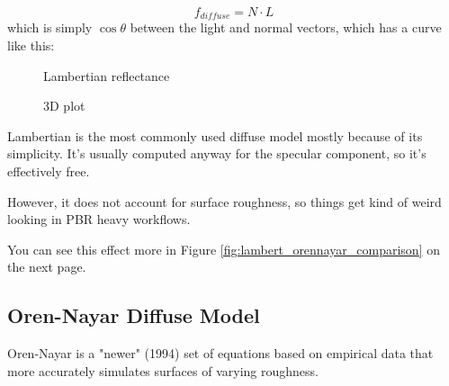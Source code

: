 \documentclass[12pt,letterpaper]{article}
\begin{document}
$$
f_{diffuse} = N \cdot L
$$
which is simply $\cos\theta$ between the light and normal vectors, which has a curve like this:
\begin{figure}[htbp]
  \begin{minipage}[t]{0.5\linewidth}
    \centering
    \pgfplotsset{width=15em}
    \caption{Lambertian reflectance}
  \end{minipage}
  \hspace{-16pt}
  \begin{minipage}[t]{0.5\linewidth}
    \centering
	\pgfplotsset{width=20em}
    \caption{3D plot}
  \end{minipage}
\end{figure}

Lambertian is the most commonly used diffuse model mostly because of its simplicity. 
It's usually computed anyway for the specular component, so it's effectively free.

However, it does not account for surface roughness, so things get kind of weird looking in PBR heavy workflows.

You can see this effect more in Figure {\color{blue}\ref{fig:lambert_orennayar_comparison}} on the next page.

\newpage

\subsection{Oren-Nayar Diffuse Model}

Oren-Nayar is a "newer" (1994) set of equations based on empirical data that more accurately simulates surfaces of varying roughness.
\end{document}

